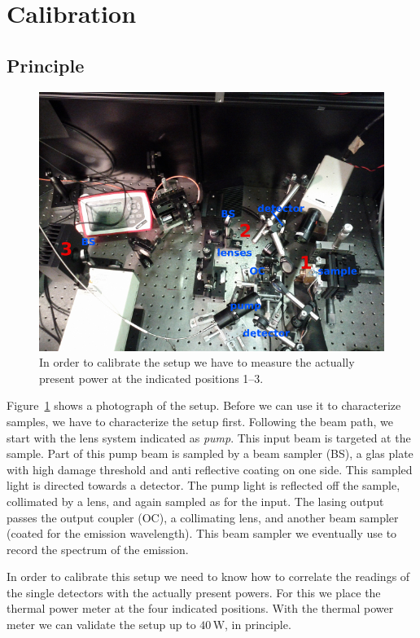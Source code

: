 \section{Calibration}
\label{sec:calib}

\subsection{Principle}

\begin{figure}
\centering
\includegraphics[width=12.5cm]{img/calib_setup.png}
\caption{In order to calibrate the setup we have to
measure the actually present power at the indicated positions 1--3.}
\label{img:calib_setup}
\end{figure}

Figure~\ref{img:calib_setup} shows a photograph of the setup.
Before we can use it to characterize samples,
we have to characterize the setup first.
Following the beam path,
we start with the lens system indicated as \emph{pump}.
This input beam is targeted at the sample.
Part of this pump beam is sampled by a beam sampler (BS),
a glas plate with high damage threshold and
anti reflective coating on one side.
This sampled light is directed towards a detector.
The pump light is reflected off the sample,
collimated by a lens,
and again sampled as for the input.
The lasing output passes the output coupler (OC),
a collimating lens,
and another beam sampler (coated for the emission wavelength).
This beam sampler we eventually use to record the spectrum of the emission.

In order to calibrate this setup we need to know
how to correlate the readings of the single detectors
with the actually present powers.
For this we place the thermal power meter at
the four indicated positions.
With the thermal power meter we can validate
the setup up to $40\,\mathrm{W}$, in principle.

